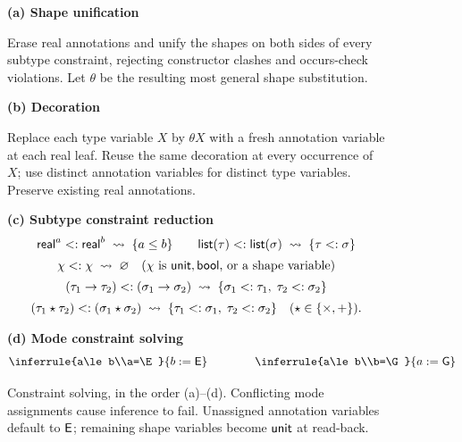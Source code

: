 \begin{figure}[t]
\centering
\footnotesize
\setlength{\abovedisplayskip}{5pt}
\setlength{\belowdisplayskip}{5pt}
\begin{minipage}{\linewidth}
\textbf{(a) Shape unification}

Erase real annotations and unify the shapes on both sides of every
subtype constraint, rejecting constructor clashes and occurs-check
violations. Let $\theta$ be the resulting most general shape substitution.

\smallskip
\textbf{(b) Decoration}

Replace each type variable $X$ by $\theta X$ with a fresh annotation
variable at each real leaf. Reuse the same decoration at every
occurrence of $X$; use distinct annotation variables for distinct
type variables. Preserve existing real annotations.
\end{minipage}

\smallskip
\textbf{(c) Subtype constraint reduction}
\[
\begin{gathered}
\mathsf{real}^{a}<:\mathsf{real}^{b}
  \;\leadsto\;\{a\le b\}
  \qquad
\mathsf{list}(\tau)<:\mathsf{list}(\sigma)
  \;\leadsto\;\{\tau<:\sigma\}\\[2pt]
\chi<:\chi
  \;\leadsto\;\varnothing
  \quad(\chi\text{ is }\mathsf{unit},\mathsf{bool}\text{, or a shape variable})\\[2pt]
(\tau_1\to\tau_2)<:(\sigma_1\to\sigma_2)
  \;\leadsto\;\{\sigma_1<:\tau_1,\;\tau_2<:\sigma_2\}\\[2pt]
(\tau_1\star\tau_2)<:(\sigma_1\star\sigma_2)
  \;\leadsto\;\{\tau_1<:\sigma_1,\;\tau_2<:\sigma_2\}
  \quad(\star\in\{\times,+\}).
\end{gathered}
\]

\medskip
\textbf{(d) Mode constraint solving}
\[
\inferrule{a\le b\\a=\E}{b:=\E}
\qquad\qquad
\inferrule{a\le b\\b=\G}{a:=\G}
\]
\caption{Constraint solving, in the order (a)--(d). Conflicting mode
assignments cause inference to fail. Unassigned annotation variables
default to $\mathsf{E}$; remaining shape variables become $\mathsf{unit}$ at read-back.}
\label{fig:inference-solving}
\end{figure}
